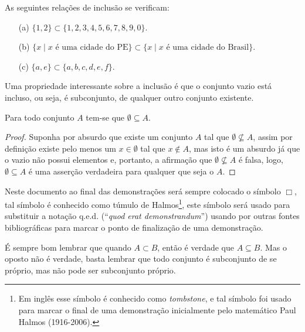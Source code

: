 \begin{exemplo}\label{exe:InclusaoPropria1}
	As seguintes relações de inclusão se verificam:
	\begin{itemize}
    \item[(a)] $\{1, 2\} \subset \{1, 2, 3, 4, 5, 6, 7, 8, 9, 0\}$.
		\item[(b)] $\{x \mid x \mbox{ é uma cidade do PE}\} \subset \{x \mid x \mbox{ é uma cidade do Brasil}\}$.
    \item[(c)] $\{a, e\} \subset \{a, b, c, d, e, f\}$.
	\end{itemize}
\end{exemplo}

Uma propriedade interessante sobre a inclusão é que o conjunto vazio está incluso, ou seja, é subconjunto, de qualquer outro conjunto existente.

\begin{teorema}\label{teo:ConjuntoVazioSubDeTodos}
	Para todo conjunto $A$ tem-se que $\emptyset \subseteq A$.
\end{teorema}

\begin{proof}
	Suponha por absurdo que existe um conjunto $A$ tal que $\emptyset \not\subseteq A$, assim por definição  existe pelo menos um $x \in \emptyset$ tal que $x \notin A$, mas isto é um absurdo já que o vazio não possui elementos e, portanto, a afirmação que $\emptyset \not\subseteq A$ é falsa, logo, $\emptyset \subseteq A$ é uma asserção verdadeira para qualquer que seja o $A$.
\end{proof}

\begin{nota}
  Neste documento ao final das demonstrações será sempre colocado o símbolo $\Box$, tal símbolo é conhecido como túmulo de Halmos\footnote{Em inglês esse símbolo é conhecido como \textit{tombstone}, e tal símbolo foi usado para marcar o final de uma demonstração inicialmente pelo matemático Paul Halmos (1916-2006).}, este símbolo será usado para substituir a notação q.e.d. (``\textit{quod erat demonstrandum}'') usando por outras fontes bibliográficas para marcar o ponto de finalização de uma demonstração. 
\end{nota}

\begin{dica}\label{tips:SobreInclusaoConjunto}
 É sempre bom lembrar que quando $A \subset B$, então é verdade que $A \subseteq B$. Mas o oposto não é verdade, basta lembrar que todo conjunto é subconjunto de se próprio, mas não pode ser subconjunto próprio.
\end{dica}

